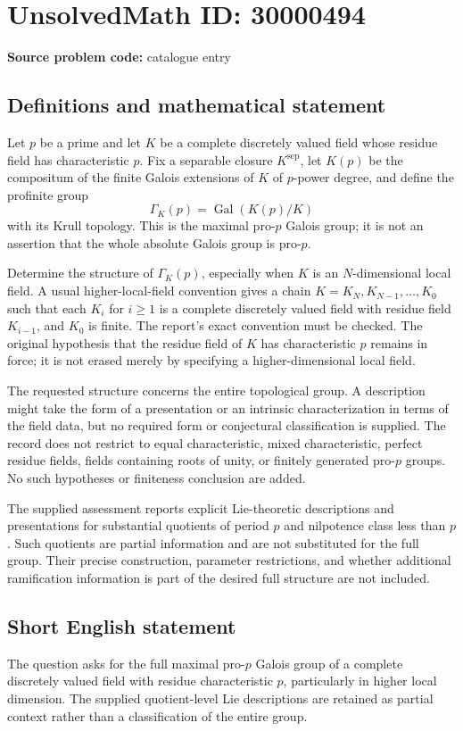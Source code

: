 \documentclass[11pt]{article}
\begin{document}
\section*{UnsolvedMath ID: 30000494}
\textbf{Source problem code:} catalogue entry
\subsection{Definitions and mathematical statement}
Let $p$ be a prime and let $K$ be a complete discretely valued field whose residue field has characteristic $p$. Fix a separable closure $K^{\mathrm{sep}}$, let $K(p)$ be the compositum of the finite Galois extensions of $K$ of $p$-power degree, and define the profinite group
\[
 \Gamma_K(p)=\operatorname{Gal}(K(p)/K)
\]
with its Krull topology. This is the maximal pro-$p$ Galois group; it is not an assertion that the whole absolute Galois group is pro-$p$.

Determine the structure of $\Gamma_K(p)$, especially when $K$ is an $N$-dimensional local field. A usual higher-local-field convention gives a chain $K=K_N,K_{N-1},\ldots,K_0$ such that each $K_i$ for $i\ge1$ is a complete discretely valued field with residue field $K_{i-1}$, and $K_0$ is finite. The report's exact convention must be checked. The original hypothesis that the residue field of $K$ has characteristic $p$ remains in force; it is not erased merely by specifying a higher-dimensional local field.

The requested structure concerns the entire topological group. A description might take the form of a presentation or an intrinsic characterization in terms of the field data, but no required form or conjectural classification is supplied. The record does not restrict to equal characteristic, mixed characteristic, perfect residue fields, fields containing roots of unity, or finitely generated pro-$p$ groups. No such hypotheses or finiteness conclusion are added.

The supplied assessment reports explicit Lie-theoretic descriptions and presentations for substantial quotients of period $p$ and nilpotence class less than $p$. Such quotients are partial information and are not substituted for the full group. Their precise construction, parameter restrictions, and whether additional ramification information is part of the desired full structure are not included.
\subsection{Short English statement}
The question asks for the full maximal pro-$p$ Galois group of a complete discretely valued field with residue characteristic $p$, particularly in higher local dimension. The supplied quotient-level Lie descriptions are retained as partial context rather than a classification of the entire group.
\end{document}
